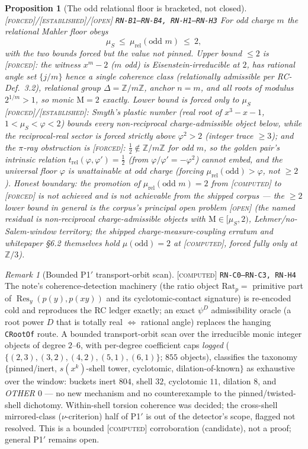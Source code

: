 \documentclass[11pt]{article}
\newcommand{\tagF}{\textcolor{cF}{\textsc{[forced]}}}
\newcommand{\tagC}{\textcolor{cC}{\textsc{[computed]}}}
\newcommand{\tagE}{\textcolor{cE}{\textsc{[established]}}}
\newcommand{\tagO}{\textcolor{cO}{\textsc{[open]}}}
\newcommand{\hx}[1]{\textcolor{cC}{\footnotesize\texttt{#1}}}
\newcommand{\Z}{\mathbb{Z}}
\newcommand{\gp}{\varphi}
\newcommand{\M}{\mathrm{M}}
\theoremstyle{plain}
\newtheorem{proposition}[theorem]{Proposition}
\theoremstyle{definition}
\theoremstyle{remark}
\newtheorem{remark}[theorem]{Remark}
\begin{document}
\begin{proposition}[The odd relational floor is bracketed, not closed]\label{prop:oddfloor}\tagF{}/\tagE{}/\tagO{} \hx{RN-B1--RN-B4, RN-H1--RN-H3}
For odd charge $m$ the relational Mahler floor obeys
\[
\mu_S\ \le\ \mu_{\mathrm{rel}}(\text{odd }m)\ \le\ 2,
\]
with the two bounds forced but the value \emph{not} pinned. \emph{Upper bound}
$\le2$ is \tagF{}: the witness $x^m-2$ ($m$ odd) is Eisenstein-irreducible at
$2$, has rational angle set $\{j/m\}$ hence a single coherence class
(relationally admissible per RC-Def.~3.2), relational group $\Delta=\Z/m\Z$,
anchor $n=m$, and all roots of modulus $2^{1/m}>1$, so monic $\M=2$ exactly.
\emph{Lower bound} is forced only to $\mu_S$ \tagF{}/\tagE{}: Smyth's plastic
number (real root of $x^3-x-1$, $1<\mu_S<\gp<2$) bounds every non-reciprocal
charge-admissible object below, while the reciprocal-real sector is forced
strictly above $\gp^2>2$ (integer trace $\ge3$); and the $\pi$-ray obstruction
is \tagF{}: $\tfrac12\notin\Z/m\Z$ for odd $m$, so the golden pair's intrinsic
relation $t_{\mathrm{rel}}(\gp,\gp')=\tfrac12$ (from $\gp/\gp'=-\gp^2$) cannot
embed, and the universal floor $\gp$ is unattainable at odd charge (forcing
$\mu_{\mathrm{rel}}(\text{odd})>\gp$, not $\ge2$). \emph{Honest boundary:} the
promotion of $\mu_{\mathrm{rel}}(\text{odd }m)=2$ from \tagC{} to \tagF{} is
\emph{not} achieved and is not achievable from the shipped corpus --- the
$\ge2$ lower bound in general is the corpus's principal open problem \tagO{}
(the named residual is non-reciprocal charge-admissible objects with
$\M\in[\mu_S,2)$, Lehmer/no-Salem-window territory; the shipped
charge-measure-coupling erratum and whitepaper \S6.2 themselves hold
$\mu(\text{odd})=2$ at \tagC{}, forced fully only at $\Z/3$).
\end{proposition}

\begin{remark}[Bounded P1$'$ transport-orbit scan]\label{rem:p1scan}\tagC{} \hx{RN-C0--RN-C3, RN-H4}
The note's coherence-detection machinery (the ratio object
$\mathrm{Rat}_p=$ primitive part of $\operatorname{Res}_y(p(y),p(xy))$ and its
cyclotomic-contact signature) is re-encoded cold and reproduces the RC ledger
exactly; an exact $\psi^D$ admissibility oracle (a root power $D$ that is
totally real $\iff$ rational angle) replaces the hanging \texttt{CRootOf}
route. A bounded transport-orbit scan over the irreducible monic integer
objects of degree $2$--$6$, with per-degree coefficient caps \emph{logged}
($\{(2,3),(3,2),(4,2),(5,1),(6,1)\}$; $855$ objects), classifies the taxonomy
$\{$pinned/inert, $s(x^k)$-shell tower, cyclotomic, dilation-of-known$\}$ as
exhaustive over the window: buckets inert $804$, shell $32$, cyclotomic $11$,
dilation $8$, and \emph{OTHER $0$} --- no new mechanism and no counterexample
to the pinned/twisted-shell dichotomy. Within-shell torsion coherence was
decided; the cross-shell mirrored-class ($\nu$-criterion) half of P1$'$ is out
of the detector's scope, flagged not resolved. This is a bounded \tagC{}
corroboration (candidate), not a proof; general P1$'$ remains open.
\end{remark}
\end{document}
